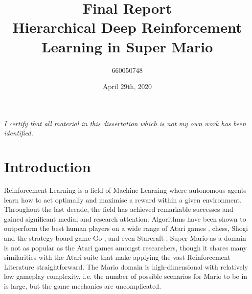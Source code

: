 \documentclass[notitlepage,a4paper,11pt]{article}
\begin{document}
\title{\textbf{Final Report\\
	\large{Hierarchical Deep Reinforcement Learning in Super Mario}}}

\author{660050748}
\date{April 29th, 2020}
\maketitle

\begin{abstract}
 
\end{abstract}


\vspace*{\fill}
\textit{I certify that all material in this dissertation which is not my own work has been identified.}

\fancyhf{}
\fancyhead[LE]{\leftmark}
\fancyhead[RO]{\rightmark}

\fancyfoot[LE,RO]{\thepage}
\pagebreak


\pagebreak
{}
\section{Introduction}
Reinforcement Learning is a field of Machine Learning where autonomous agents learn how to act optimally and maximise a reward within a given environment. Throughout the last decade, the field has achieved remarkable successes and gained significant medial and research attention. Algorithms have been shown to outperform the best human players on a wide range of Atari games \cite{DBLP:journals/corr/MnihKSGAWR13}, chess, Shogi and the strategy board game Go \cite{alpha_go}, and even Starcraft \cite{arulkumaran2019alphastar}. Super Mario as a domain is not as popular as the Atari games amongst researchers, though it shares many similarities with the Atari suite that make applying the vast Reinforcement Literature straightforward. The Mario domain is high-dimensional with relatively low gameplay complexity, i.e. the number of possible scenarios for Mario to be in is large, but the game mechanics are uncomplicated.
\end{document}
